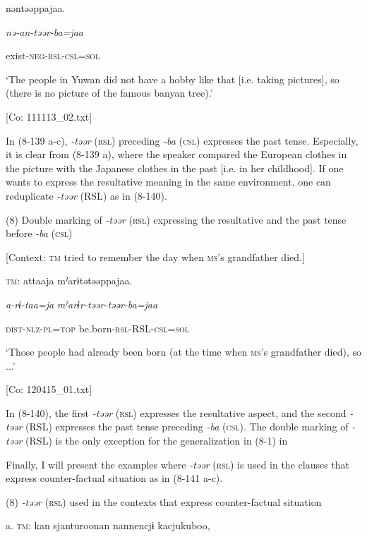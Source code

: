       nəntəəppajaa.

      \textit{nə-an-təər-ba=jaa}

      exist-\textsc{neg}-\textsc{rsl}-\textsc{csl}=\textsc{sol}

      ‘The people in Yuwan did not have a hobby like that [i.e. taking pictures], so (there is no picture of the famous banyan tree).’

      [Co: 111113\_02.txt]

In (8-139 a-c), \textit{-təər} (\textsc{rsl}) preceding \textit{{}-ba} (\textsc{csl}) expresses the past tense. Especially, it is clear from (8-139 a), where the speaker compared the European clothes in the picture with the Japanese clothes in the past [i.e. in her childhood]. If one wants to express the resultative meaning in the same environment, one can reduplicate \textit{-təər} (RSL) as in (8-140).

(8)  Double marking of \textit{{}-təər} (\textsc{rsl}) expressing the resultative and the past tense before \textit{{}-ba} (\textsc{csl})

  [Context: \textsc{tm} tried to remember the day when \textsc{ms}’s grandfather died.]

  \textsc{tm}:  attaaja  mˀarɨtətəəppajaa.

    \textit{a-rɨ-taa=ja}  \textit{mˀarɨr-təər-təər-ba=jaa}

    \textsc{dist}-\textsc{nlz}-\textsc{pl}=\textsc{top}  be.born-\textsc{rsl}-RSL-\textsc{csl}=\textsc{sol}

    ‘Those people had already been born (at the time when \textsc{ms}’s grandfather died), so ...’

    [Co: 120415\_01.txt]

In (8-140), the first \textit{{}-təər} (\textsc{rsl}) expresses the resultative aspect, and the second \textit{{}-təər} (RSL) expresses the past tense preceding \textit{-ba} (\textsc{csl}). The double marking of \textit{{}-təər} (RSL) is the only exception for the generalization in (8-1) in 

  Finally, I will present the examples where \textit{{}-təər} (\textsc{rsl}) is used in the clauses that express counter-factual situation as in (8-141 a-c).

(8)  \textit{{}-təər} (\textsc{rsl}) used in the contexts that express counter-factual situation

  a.  \textsc{tm}:  kan  sjanturoonan  {\textbar}nannen{\textbar}cjɨ  kacjukuboo,


